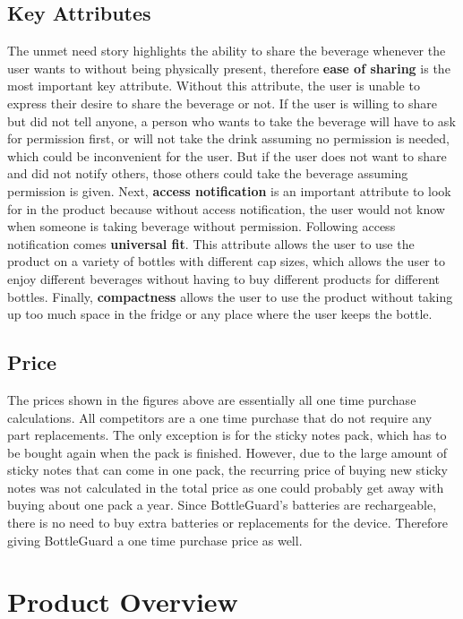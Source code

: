 \documentclass[12pt]{article}
\begin{document}
	\subsection*{Key Attributes}
	The unmet need story highlights the ability to share the beverage whenever the user wants to without being physically present, therefore \textbf{ease of sharing} is the most important key attribute. Without this attribute, the user is unable to express their desire to share the beverage or not. If the user is willing to share but did not tell anyone, a person who wants to take the beverage will have to ask for permission first, or will not take the drink assuming no permission is needed, which could be inconvenient for the user. But if the user does not want to share and did not notify others, those others could take the beverage assuming permission is given. Next, \textbf{access notification} is an important attribute to look for in the product because without access notification, the user would not know when someone is taking beverage without permission. Following access notification comes \textbf{universal fit}. This attribute allows the user to use the product on a variety of bottles with different cap sizes, which allows the user to enjoy different beverages without having to buy different products for different bottles. Finally, \textbf{compactness} allows the user to use the product without taking up too much space in the fridge or any place where the user keeps the bottle.
	
	\subsection*{Price}
	The prices shown in the figures above are essentially all one time purchase calculations.  All competitors are a one time purchase that do not require any part replacements. The only exception is for the sticky notes pack, which has to be bought again when the pack is finished. However, due to the large amount of sticky notes that can come in one pack, the recurring price of buying new sticky notes was not calculated in the total price as one could probably get away with buying about one pack a year. Since BottleGuard’s batteries are rechargeable, there is no need to buy extra batteries or replacements for the device. Therefore giving BottleGuard a one time purchase price as well.  
	
	\section*{Product Overview}
\end{document}
